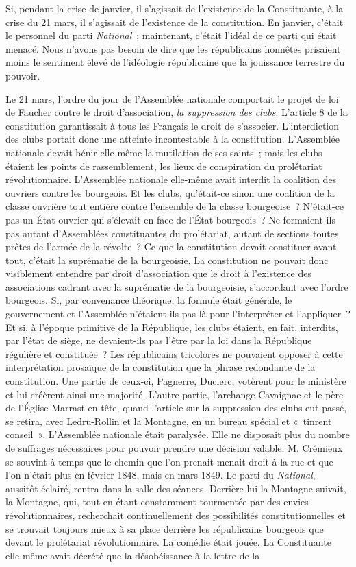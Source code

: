 \documentclass[french,twoside]{book} %
\begin{document}
Si, pendant la crise de janvier, il s’agissait de l’existence de la Constituante, à la crise du 21 mars, il s’agissait de l’existence de la constitution. En janvier, c’était le personnel du parti \emph{National} ; maintenant, c’était l’idéal de ce parti qui était menacé. Nous n’avons pas besoin de dire que les républicains honnêtes prisaient moins le sentiment élevé de l’idéologie républicaine que la jouissance terrestre du pouvoir.\par
Le 21 mars, l’ordre du jour de l’Assemblée nationale comportait le projet de loi de Faucher contre le droit d’association, \emph{la suppression des clubs}. L’article 8 de la constitution garantissait à tous les Français le droit de s’associer. L’interdiction des clubs portait donc une atteinte incontestable à la constitution. L’Assemblée nationale devait bénir elle-même la mutilation de ses saints ; mais les clubs étaient les points de rassemblement, les lieux de conspiration du prolétariat révolutionnaire. L’Assemblée nationale elle-même avait interdit la coalition des ouvriers contre les bourgeois. Et les clubs, qu’était-ce sinon une coalition de la classe ouvrière tout entière contre l’ensemble de la classe bourgeoise ? N’était-ce pas un État ouvrier qui s’élevait en face de l’État bourgeois ? Ne formaient-ils pas autant d’Assemblées constituantes du prolétariat, autant de sections toutes prêtes de l’armée de la révolte ? Ce que la constitution devait constituer avant tout, c’était la suprématie de la bourgeoisie. La constitution ne pouvait donc visiblement entendre par droit d’association que le droit à l’existence des associations cadrant avec la suprématie de la bourgeoisie, s’accordant avec l’ordre bourgeois. Si, par convenance théorique, la formule était générale, le gouvernement et l’Assemblée n’étaient-ils pas là pour l’interpréter et l’appliquer ? Et si, à l’époque primitive de la République, les clubs étaient, en fait, interdits, par l’état de siège, ne devaient-ils pas l’être par la loi dans la République régulière et constituée ? Les républicains tricolores ne pouvaient opposer à cette interprétation prosaïque de la constitution que la phrase redondante de la constitution. Une partie de ceux-ci, Pagnerre, Duclerc, votèrent pour le ministère et lui créèrent ainsi une majorité. L’autre partie, l’archange Cavaignac et le père de l’Église Marrast en tête, quand l’article sur la suppression des clubs eut passé, se retira, avec Ledru-Rollin et la Montagne, en un bureau spécial et « tinrent conseil ». L’Assemblée nationale était paralysée. Elle ne disposait plus du nombre de suffrages nécessaires pour pouvoir prendre une décision valable. M. Crémieux se souvint à temps que le chemin que l’on prenait menait droit à la rue et que l’on n’était plus en février 1848, mais en mars 1849. Le parti du \emph{National}, aussitôt éclairé, rentra dans la salle des séances. Derrière lui la Montagne suivait, la Montagne, qui, tout en étant constamment tourmentée par des envies révolutionnaires, recherchait continuellement des possibilités constitutionnelles et se trouvait toujours mieux à sa place derrière les républicains bourgeois que devant le prolétariat révolutionnaire. La comédie était jouée. La Constituante elle-même avait décrété que la désobéissance à la lettre de la 
\end{document}
